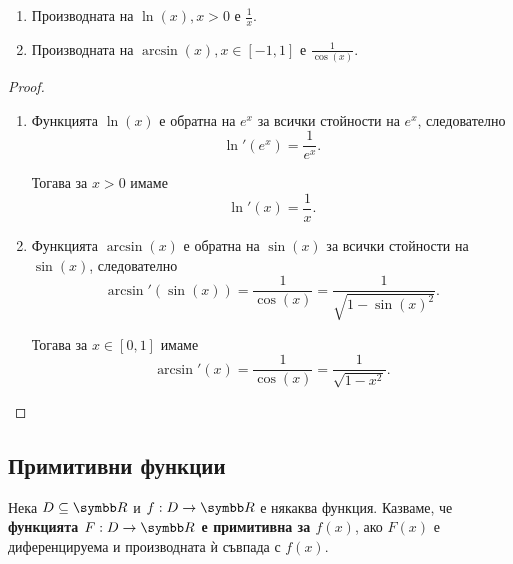 \documentclass[numbers=endperiod, bibliography=totocnumbered]{scrartcl}
\begin{document}
\begin{theorem}
  \mbox{}
  \begin{enumerate}
    \item Производната на \( \ln(x), x > 0 \) е \( \frac 1 x \).
    \item Производната на \( \arcsin(x), x \in [-1, 1] \) е \( \frac 1 {\cos(x)} \).
  \end{enumerate}
\end{theorem}
\begin{proof}
  \mbox{}
  \begin{enumerate}
    \item Функцията \( \ln(x) \) е обратна на \( e^x \) за всички стойности на \( e^x \), следователно
    \begin{equation*}
      \ln'(e^x) = \frac 1 {e^x}.
    \end{equation*}

    Тогава за \( x > 0 \) имаме
    \begin{equation*}
      \ln'(x) = \frac 1 {x}.
    \end{equation*}

    \item Функцията \( \arcsin(x) \) е обратна на \( \sin(x) \) за всички стойности на \( \sin(x) \), следователно
    \begin{equation*}
      \arcsin'(\sin(x)) = \frac 1 {\cos(x)} = \frac 1 {\sqrt{1 - {\sin(x)}^2}}.
    \end{equation*}

    Тогава за \( x \in [0, 1] \) имаме
    \begin{equation*}
      \arcsin'(x) = \frac 1 {\cos(x)} = \frac 1 {\sqrt{1 - x^2}}.
    \end{equation*}
  \end{enumerate}
\end{proof}

\subsection{Примитивни функции}

\begin{definition}
  Нека \( D \subseteq \R \) и \( f: D \to \R \) е някаква функция. Казваме, че \textbf{функцията \( F: D \to \R \) е примитивна за \( f(x) \)}, ако \( F(x) \) е диференцируема и производната ѝ съвпада с \( f(x) \).
\end{definition}
\end{document}
